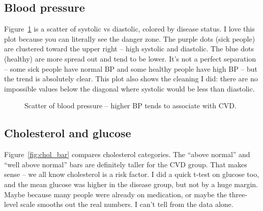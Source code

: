 \documentclass[12pt, a4paper, oneside]{book}
\begin{document}
\subsection{Blood pressure}
Figure~\ref{fig:bp_scatter} is a scatter of systolic vs diastolic, colored by disease status. I love this plot because you can literally see the danger zone. The purple dots (sick people) are clustered toward the upper right -- high systolic and diastolic. The blue dots (healthy) are more spread out and tend to be lower. It's not a perfect separation -- some sick people have normal BP and some healthy people have high BP -- but the trend is absolutely clear. This plot also shows the cleaning I did: there are no impossible values below the diagonal where systolic would be less than diastolic.

\begin{figure}[htbp]
\centering
{}
\caption{Scatter of blood pressure -- higher BP tends to associate with CVD.}
\label{fig:bp_scatter}
\end{figure}

\subsection{Cholesterol and glucose}
Figure~\ref{fig:chol_bar} compares cholesterol categories. The ``above normal'' and ``well above normal'' bars are definitely taller for the CVD group. That makes sense -- we all know cholesterol is a risk factor. I did a quick t-test on glucose too, and the mean glucose was higher in the disease group, but not by a huge margin. Maybe because many people were already on medication, or maybe the three-level scale smooths out the real numbers. I can't tell from the data alone.
\end{document}

